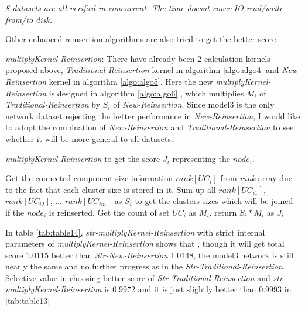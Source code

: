 \documentclass{article}
\begin{document}
\begin{table}[!htbp]
\begin{adjustwidth}{-2cm}{}
\begin{threeparttable}
\begin{tabular}{|c|c|c|c|c|c|c|c|c|c|}
			\end{tabular}
			\begin{tablenotes}
				\small
				\item\textit{ 8 datasets are all verified in concurrent. The time doesn\textquotesingle t cover IO read/write from/to disk.}
			\end{tablenotes}			
		\end{threeparttable}
	\end{adjustwidth}	
	\end{table}
	 
	Other enhanced reinsertion algorithms are also tried to get the better score.
	 
	\begin{enumerate}
		
	\begin{item}
			
		\textit{multiplyKernel-Reinsertion}: There have already been 2 calculation kernels proposed above, \textit{Traditional-Reinsertion} kernel in algorithm \ref{algo:algo4} and \textit{New-Reinsertion} kernel in algorithm \ref{algo:algo5}. Here the new \textit{multiplyKernel-Reinsertion} is designed in algorithm \ref{algo:algo6} , which multiplies $M_i$ of \textit{Traditional-Reinsertion} by $S_i$ of \textit{New-Reinsertion}. Since model3 is the only network dataset rejecting the better performance in \textit{New-Reinsertion}, I would like to adopt the combination of \textit{New-Reinsertion} and \textit{Traditional-Reinsertion} to see whether it will be more general to all datasets.

		\begin{algorithm}[!htbp]
			\caption{ \textit{multiplyKernel-Reinsertion} to get the score $J_i$ representing the $node_i$. }
			\label{algo:algo6}
			\begin{algorithmic}[1]
				\State Get the connected component size information $rank[UC_{i}]$ from \textit{rank} array due to the fact that each cluster size is stored in it. Sum up all $rank[UC_{i1}]$, $rank[UC_{i2}]$, ... $rank[UC_{im}]$ as $S_i$ to get the clusters sizes which will be joined if the $node_i$ is reinserted.
				\State Get the count of set $UC_{i}$ as $M_i$.			
				\State return $S_i*M_i$ as $J_i$ 
			\end{algorithmic}
		\end{algorithm}	
		
		In table \ref{tab:table14}, \textit{str-multiplyKernel-Reinsertion} with strict internal parameters of \textit{multiplyKernel-Reinsertion} shows that , though it will get total score 1.0115 better than \textit{Str-New-Reinsertion} 1.0148, the model3 network is still nearly the same and no further progress as in the \textit{Str-Traditional-Reinsertion}. Selective value in choosing better score of \textit{Str-Traditional-Reinsertion} and \textit{str-multiplyKernel-Reinsertion} is 0.9972 and it is just slightly better than 0.9993 in \ref{tab:table13}


\end{item}
\end{enumerate}
\end{document}

